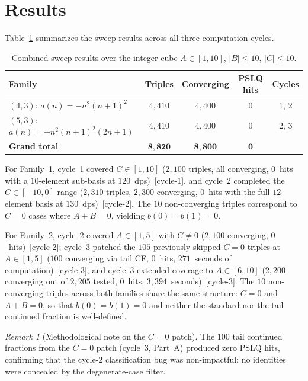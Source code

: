 \documentclass[11pt]{amsart}
\theoremstyle{plain}
\theoremstyle{remark}
\newtheorem{remark}{Remark}
\begin{document}
\section{Results}\label{sec:results}

Table~\ref{tab:main} summarizes the sweep results across all
three computation cycles.

\begin{table}[ht]
\centering
\caption{Combined sweep results over the integer cube
  $A \in [1,10]$, $|B| \leq 10$, $|C| \leq 10$.}
\label{tab:main}
\begin{tabular}{@{}lcccc@{}}
\toprule
Family & Triples & Converging & PSLQ hits & Cycles \\
\midrule
$(4,3)$:\; $a(n) = -n^2(n{+}1)^2$
  & $4{,}410$ & $4{,}400$ & $0$ & 1, 2 \\[2pt]
$(5,3)$:\; $a(n) = -n^2(n{+}1)^2(2n{+}1)$
  & $4{,}410$ & $4{,}400$ & $0$ & 2, 3 \\
\midrule
\textbf{Grand total}
  & $\mathbf{8{,}820}$ & $\mathbf{8{,}800}$ & $\mathbf{0}$ & \\
\bottomrule
\end{tabular}
\end{table}

For Family~1, cycle~1 covered $C \in [1,10]$
($2{,}100$ triples, all converging, $0$~hits with a
$10$-element sub-basis at $120$~dps)~[cycle-1],
and cycle~2 completed the $C \in [-10,0]$ range
($2{,}310$ triples, $2{,}300$ converging, $0$~hits with the
full $12$-element basis at $130$~dps)~[cycle-2].
The $10$ non-converging triples correspond to
$C = 0$ cases where $A + B = 0$,
yielding $b(0) = b(1) = 0$.

For Family~2, cycle~2 covered $A \in [1,5]$ with $C \neq 0$
($2{,}100$ converging, $0$~hits)~[cycle-2];
cycle~3 patched the $105$ previously-skipped $C = 0$ triples
at $A \in [1,5]$
($100$ converging via tail CF, $0$~hits,
$271$~seconds of computation)~[cycle-3];
and cycle~3 extended coverage to $A \in [6,10]$
($2{,}200$ converging out of $2{,}205$ tested,
$0$~hits, $3{,}394$~seconds)~[cycle-3].
The $10$ non-converging triples across both families
share the same structure: $C = 0$ and $A + B = 0$,
so that $b(0) = b(1) = 0$ and neither the standard
nor the tail continued fraction is well-defined.

\begin{remark}[Methodological note on the $C = 0$ patch]
The $100$ tail continued fractions from the $C = 0$ patch
(cycle~3, Part~A) produced zero PSLQ hits,
confirming that the cycle-2 classification bug was non-impactful:
no identities were concealed by the degenerate-case filter.
\end{remark}
\end{document}
